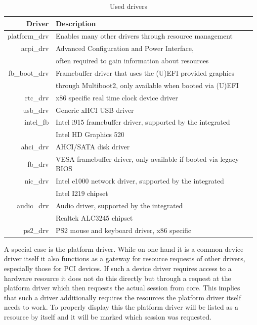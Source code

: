 \documentclass[
a4paper,
11pt,
twoside
]{report}
\begin{document}
		\begin{table}[]
			\centering
			\begin{tabular}{r|l}
				Driver        & 
				Description 
				\\ \hline
				platform\_drv & 
				Enables many other drivers through resource management
				\\ \hline
				acpi\_drv     &
				Advanced Configuration and Power Interface,
				\\& often required to gain information about resources \citep{acpi_spec}
				\\ \hline
				fb\_boot\_drv &
				Framebuffer driver that uses the (U)EFI provided graphics
				\\& through Multiboot2, only available when booted via (U)EFI  \citep{multiboot2}
				\\ \hline
				rtc\_drv      &
				x86 specific real time clock device driver
				\\ \hline
				usb\_drv      &
				Generic xHCI USB driver \citep{xhci}
				\\ \hline
				intel\_fb     &
				Intel i915 framebuffer driver, supported by the integrated
				\\& Intel HD Graphics 520 \citep{x260}
				\\ \hline
				ahci\_drv     &
				AHCI/SATA disk driver
				\\ \hline
				fb\_drv       &
				VESA framebuffer driver, only available if booted via legacy BIOS
				\\ \hline
				nic\_drv      &
				Intel e1000 network driver, supported by the integrated
				\\& Intel I219 chipset \citep{x260}
				\\  \hline
				audio\_drv    &
				Audio driver, supported by the integrated
				\\& Realtek ALC3245 chipset \citep{x260}
				\\  \hline
				ps2\_drv      &
				PS2 mouse and keyboard driver, x86 specific
			\end{tabular}
			\caption{Used drivers}
			\label{driver_selection}
		\end{table}
		
		A special case is the platform driver.
		While on one hand it is a common device driver itself it also functions as a gateway for resource requests of other drivers, especially those for PCI devices.
		If such a device driver requires access to a hardware resource it does not do this directly but through a request at the platform driver which then requests the actual session from core.
		This implies that such a driver additionally requires the resources the platform driver itself needs to work.
		To properly display this the platform driver will be listed as a resource by itself and it will be marked which session was requested.
		
\end{document}
